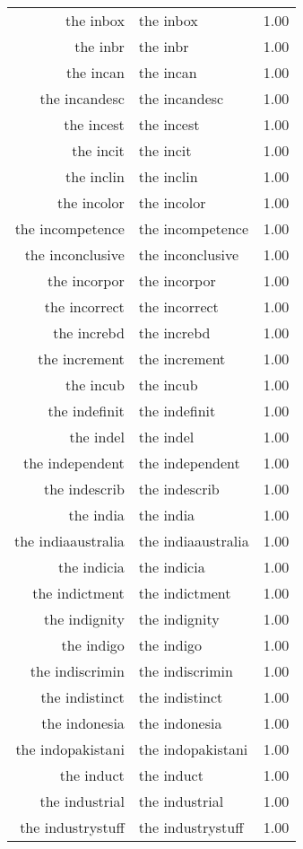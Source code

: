 \begin{table}[ht]
\begin{tabular}{rlr}
  the inbox & the inbox & 1.00 \\ 
  the inbr & the inbr & 1.00 \\ 
  the incan & the incan & 1.00 \\ 
  the incandesc & the incandesc & 1.00 \\ 
  the incest & the incest & 1.00 \\ 
  the incit & the incit & 1.00 \\ 
  the inclin & the inclin & 1.00 \\ 
  the incolor & the incolor & 1.00 \\ 
  the incompetence & the incompetence & 1.00 \\ 
  the inconclusive & the inconclusive & 1.00 \\ 
  the incorpor & the incorpor & 1.00 \\ 
  the incorrect & the incorrect & 1.00 \\ 
  the increbd & the increbd & 1.00 \\ 
  the increment & the increment & 1.00 \\ 
  the incub & the incub & 1.00 \\ 
  the indefinit & the indefinit & 1.00 \\ 
  the indel & the indel & 1.00 \\ 
  the independent & the independent & 1.00 \\ 
  the indescrib & the indescrib & 1.00 \\ 
  the india & the india & 1.00 \\ 
  the indiaaustralia & the indiaaustralia & 1.00 \\ 
  the indicia & the indicia & 1.00 \\ 
  the indictment & the indictment & 1.00 \\ 
  the indignity & the indignity & 1.00 \\ 
  the indigo & the indigo & 1.00 \\ 
  the indiscrimin & the indiscrimin & 1.00 \\ 
  the indistinct & the indistinct & 1.00 \\ 
  the indonesia & the indonesia & 1.00 \\ 
  the indopakistani & the indopakistani & 1.00 \\ 
  the induct & the induct & 1.00 \\ 
  the industrial & the industrial & 1.00 \\ 
  the industrystuff & the industrystuff & 1.00 \\ 

\end{tabular}
\end{table}
